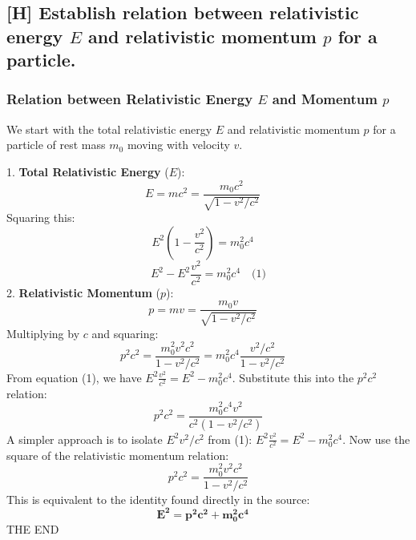 \documentclass[12pt]{article}
\begin{document}
\subsection{[H] Establish relation between relativistic energy $E$ and relativistic momentum $p$ for a particle.}

\subsubsection*{Relation between Relativistic Energy $E$ and Momentum $p$}
We start with the total relativistic energy $E$ and relativistic momentum $p$ for a particle of rest mass $m_0$ moving with velocity $v$.

1.  \textbf{Total Relativistic Energy} ($E$):
    $$
    E = mc^2 = \frac{m_0 c^2}{\sqrt{1-v^2/c^2}} \quad \text{}
    $$
    Squaring this:
    $$
    E^2 \left(1 - \frac{v^2}{c^2}\right) = m_0^2 c^4 \quad \text{}
    $$
    $$
    E^2 - E^2 \frac{v^2}{c^2} = m_0^2 c^4 \quad \text{(1)}
    $$
2.  \textbf{Relativistic Momentum} ($p$):
    $$
    p = mv = \frac{m_0 v}{\sqrt{1-v^2/c^2}} \quad \text{}
    $$
    Multiplying by $c$ and squaring:
    $$
    p^2 c^2 = \frac{m_0^2 v^2 c^2}{1-v^2/c^2} = m_0^2 c^4 \frac{v^2/c^2}{1-v^2/c^2} \quad \text{}
    $$
    From equation (1), we have $E^2 \frac{v^2}{c^2} = E^2 - m_0^2 c^4$. Substitute this into the $p^2 c^2$ relation:
    $$
    p^2 c^2 = \frac{m_0^2 c^4 v^2}{c^2 (1-v^2/c^2)}
    $$
    A simpler approach is to isolate $E^2 v^2/c^2$ from (1): $E^2 \frac{v^2}{c^2} = E^2 - m_0^2 c^4$.
    Now use the square of the relativistic momentum relation:
    $$
    p^2 c^2 = \frac{m_0^2 v^2 c^2}{1-v^2/c^2}
    $$
    This is equivalent to the identity found directly in the source:
    $$
    \mathbf{E^2 = p^2c^2 + m_0^2c^4} \quad \text{}
    $$
\vfill
\centering THE END
\end{document}
